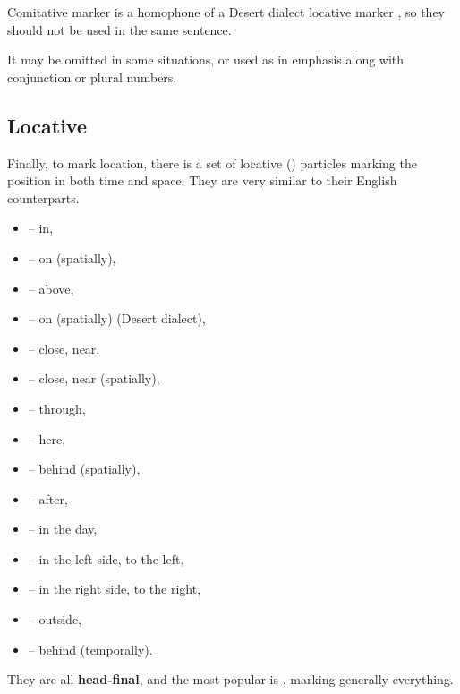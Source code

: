 Comitative marker is a homophone of a Desert dialect locative marker ,
so they should not be used in the same sentence.

It may be omitted in some situations, or used as in emphasis along with
conjunction or plural numbers.




\subsection{Locative}

Finally, to mark location, there is a set of locative (\Loc{}) particles marking
the position in both time and space. They are very similar to their English
counterparts.

\begin{itemize}
    \item {} -- in,
    \item {} -- on (spatially),
    \item {} -- above,
    \item {} -- on (spatially) (Desert dialect),
    \item {} -- close, near,
    \item {} -- close, near (spatially),
    \item {} -- through,
    \item {} -- here,
    \item {} -- behind (spatially),
    \item {} -- after,
    \item {} -- in the day,
    \item {} -- in the left side, to the left,
    \item {} -- in the right side, to the right,
    \item {} -- outside,
    \item {} -- behind (temporally).
\end{itemize}

They are all \textbf{head-final}, and the most popular is , marking
generally everything.

